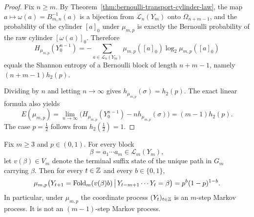 \begin{proof}
Fix $n\ge m$.  By Theorem~\ref{thm:bernoulli-transport-cylinder-law}, the map
$a\mapsto \omega(a)=B_{m,n}^{-1}(a)$ is a bijection from $\mathcal L_n(Y_m)$
onto $\Omega_{n+m-1}$, and the probability of the cylinder $[a]_0$ under
$\mu_{m,p}$ is exactly the Bernoulli probability of the raw cylinder
$[\omega(a)]_0$.  Therefore
\[
H_{\mu_{m,p}}(Y_0^{n-1})
=
-\sum_{a\in\mathcal L_n(Y_m)}\mu_{m,p}([a]_0)\log_2\mu_{m,p}([a]_0)
\]
equals the Shannon entropy of a Bernoulli block of length $n+m-1$, namely
$(n+m-1)h_2(p)$.

Dividing by $n$ and letting $n\to\infty$ gives
$h_{\mu_{m,p}}(\sigma)=h_2(p)$.  The exact linear formula also yields
\[
E(\mu_{m,p})
=
\lim_{n\to\infty}\bigl(H_{\mu_{m,p}}(Y_0^{n-1})-nh_{\mu_{m,p}}(\sigma)\bigr)
=(m-1)h_2(p).
\]
The case $p=\tfrac12$ follows from $h_2(\tfrac12)=1$.
\end{proof}

\begin{theorem}
\label{thm:exact-markov-order-bernoulli}
Fix $m\ge 3$ and $p\in(0,1)$.  For every block
\[
\beta=a_1\cdots a_m\in\mathcal L_m(Y_m),
\]
let $v(\beta)\in V_m$ denote the terminal suffix state of the unique path in
$G_m$ carrying $\beta$.  Then for every $t\in\mathbb{Z}$ and every $b\in\{0,1\}$,
\[
\mu_{m,p}\bigl(
Y_{t+1}=\operatorname{Fold}_m(v(\beta)b)\,\big|\,Y_{t-m+1}\cdots Y_t=\beta
\bigr)
=
p^b(1-p)^{1-b}.
\]
In particular, under $\mu_{m,p}$ the coordinate process $(Y_t)_{t\in\mathbb{Z}}$ is
an $m$-step Markov process.  It is not an $(m-1)$-step Markov process.
\end{theorem}

